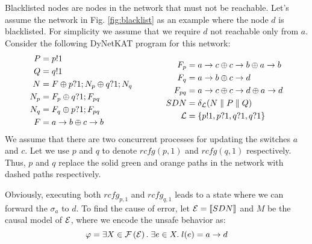 \newcommand{\ra}    { \rightarrow }
\newcommand{\sem}[1]{ \llbracket #1 \rrbracket }

\begin{exmp}


Blacklisted nodes are nodes in the network that must not
be reachable.
Let's assume the network in Fig. \ref{fig:blacklist} as
an example where the node $d$ is blacklisted.
For simplicity we assume that we require
$d$ not reachable only from $a$.
Consider the following DyNetKAT program for this network:
\begin{equation*}
\begin{aligned}[c]
    P   & = p!1                             \\
    Q   & = q!1                             \\
    N   & = F \oplus p?1;N_p \oplus q?1;N_q \\
    N_p & = F_p \oplus q?1;F_{pq}           \\
    N_q & = F_q \oplus p?1;F_{pq}           \\
    F   & = a\ra b \oplus c\ra b            \\
\end{aligned}
\qquad\qquad
\begin{aligned}[c]
    F_p         & = a\ra c \oplus c\ra b \oplus a\ra b \\
    F_q         & = a\ra b \oplus c\ra d               \\
    F_{pq}      & = a\ra c \oplus c\ra d \oplus a\ra d \\
    SDN         & = \delta_{\mathcal{L}} (N
    \parallel P \parallel Q)                           \\
    \mathcal{L} & = \set{p!1,p?1,q?1,q?1}                \\
\end{aligned}
\end{equation*}
We assume that there are two concurrent processes for updating
the switches $a$ and $c$.
Let we use $p$ and $q$ to denote $rcfg(p,1)$ and
$rcfg(q,1)$ respectively.
Thus, $p$ and $q$ replace the solid green and orange
paths in the network with dashed paths respectively.

Obviously, executing both $rcfg_{p,1}$ and $rcfg_{q,1}$ leads
to a state where we can forward the $\sigma_a$ to $d$.
To find the cause of error, let $\es = \sem{SDN}$ and $M$
be the causal model of $\mathcal{E}$, where we encode the unsafe behavior 
as:
\begin{equation*}
  \varphi = \exists X \in \conf{\es}.\;\exists e \in X.\;l(e) = a \ra d
\end{equation*}


\end{exmp}
